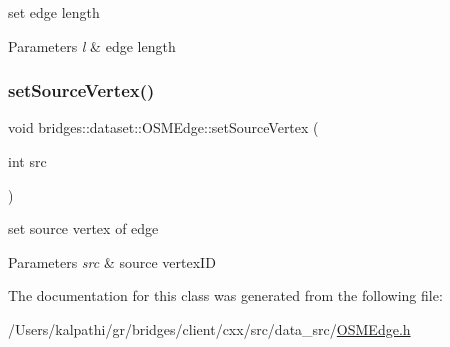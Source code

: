 set edge length


\begin{DoxyParams}{Parameters}
{\em l} & edge length \\
\hline
\end{DoxyParams}
\mbox{\label{classbridges_1_1dataset_1_1_o_s_m_edge_ac8a56c77922a5729b42d1e39f3f6516f}} 
\subsubsection{\texorpdfstring{set\+Source\+Vertex()}{setSourceVertex()}}
{\footnotesize\ttfamily void bridges\+::dataset\+::\+O\+S\+M\+Edge\+::set\+Source\+Vertex (\begin{DoxyParamCaption}\item[{int}]{src }\end{DoxyParamCaption})\hspace{0.3cm}{\ttfamily [inline]}}

set source vertex of edge


\begin{DoxyParams}{Parameters}
{\em src} & source vertex\+ID \\
\hline
\end{DoxyParams}


The documentation for this class was generated from the following file\+:\begin{DoxyCompactItemize}
\item 
/\+Users/kalpathi/gr/bridges/client/cxx/src/data\+\_\+src/\mbox{\hyperlink{_o_s_m_edge_8h}{O\+S\+M\+Edge.\+h}}\end{DoxyCompactItemize}
